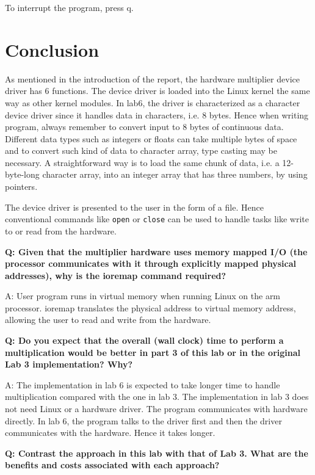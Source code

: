 \documentclass[11pt,letterpaper,titlepage]{article}
\begin{document}
To interrupt the program, press q.

\newpage

\part{Conclusion}

As mentioned in the introduction of the report, the hardware multiplier device driver has 6 functions. The device driver is loaded into the Linux kernel the same way as other kernel modules. In lab6, the driver is characterized as a character device driver since it handles data in characters, i.e. 8 bytes. Hence when writing program, always remember to convert input to 8 bytes of continuous data. Different data types such as integers or floats can take multiple bytes of space and to convert such kind of data to character array, type casting may be necessary. A straightforward way is to load the same chunk of data, i.e. a 12-byte-long character array, into an integer array that has three numbers, by using pointers.

The device driver is presented to the user in the form of a file. Hence conventional commands like \texttt{open} or \texttt{close} can be used to handle tasks like write to or read from the hardware.

\textbf{Q: Given that the multiplier hardware uses memory mapped I/O (the processor communicates with
it through explicitly mapped physical addresses), why is the ioremap command required?}

A: User program runs in virtual memory when running Linux on the arm processor. ioremap translates the physical address to virtual memory address, allowing the user to read and write from the hardware.

\textbf{Q: Do you expect that the overall (wall clock) time to perform a multiplication would be better in part 3 of this lab or in the original Lab 3 implementation? Why?}

A: The implementation in lab 6 is expected to take longer time to handle multiplication compared with the one in lab 3. The implementation in lab 3 does not need Linux or a hardware driver. The program communicates with hardware directly. In lab 6, the program talks to the driver first and then the driver communicates with the hardware. Hence it takes longer.

\textbf{Q: Contrast the approach in this lab with that of Lab 3. What are the benefits and costs associated with each approach?}
\end{document}
